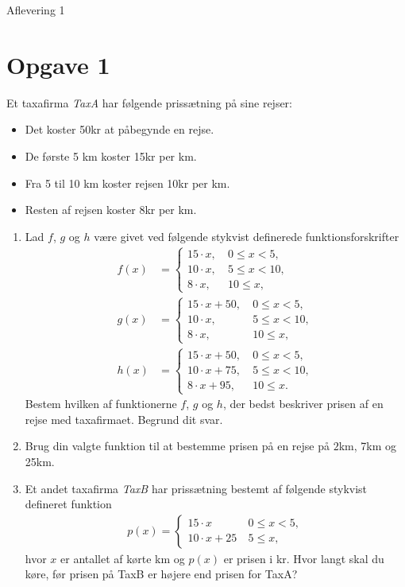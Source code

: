 
\begin{center}
\Huge
Aflevering 1
\end{center}

\section*{Opgave 1}
Et taxafirma \textit{TaxA} har følgende prissætning på sine rejser: 
\begin{itemize}
\item Det koster 50kr at påbegynde en rejse.
\item De første 5 km koster 15kr per km.
\item Fra 5 til 10 km koster rejsen 10kr per km.
\item Resten af rejsen koster 8kr per km.   
\end{itemize}
\begin{enumerate}[label=\roman*)]
\item Lad $f$, $g$ og $h$ være givet ved følgende stykvist definerede funktionsforskrifter
\begin{align*}
f(x) &= \begin{cases} 15\cdot x, \ &0\leq x < 5,\\
10 \cdot x, \ &5\leq x < 10,\\
8\cdot x, \ &10 \leq x,
\end{cases}\\
g(x) &= \begin{cases}
15\cdot x + 50, \ &0\leq x < 5,\\
10 \cdot x, \ &5\leq x < 10,\\
8\cdot x, \ &10 \leq x,
\end{cases}\\
h(x) &= \begin{cases}
15\cdot x + 50, \ &0\leq x < 5,\\
10 \cdot x + 75, \ &5\leq x < 10,\\
8\cdot x +95, \ &10 \leq x.
\end{cases}
\end{align*}
Bestem hvilken af funktionerne $f$, $g$ og $h$, der bedst beskriver prisen af en rejse med taxafirmaet. Begrund dit svar.
\item Brug din valgte funktion til at bestemme prisen på en rejse på $2$km, 7km og 25km.
\item Et andet taxafirma \textit{TaxB} har prissætning bestemt af følgende stykvist defineret funktion
\begin{align*}
p(x) = 
\begin{cases}
15\cdot x \ &0\leq x < 5,\\
10 \cdot x + 25 \ &5 \leq x,
\end{cases}
\end{align*}
hvor $x$ er antallet af kørte km og $p(x)$ er prisen i kr. Hvor langt skal du køre, før prisen på TaxB er højere end prisen for TaxA?
\end{enumerate}

